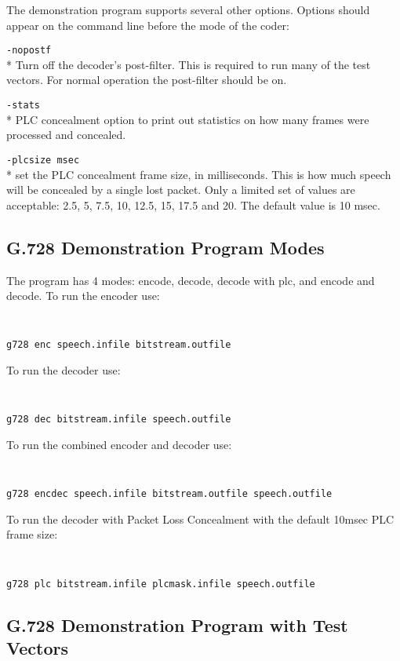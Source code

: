 The demonstration program supports several other options. Options should
appear on the command line before the mode of the coder:

{\tt -nopostf}\\*
Turn off the decoder's post-filter. This is required to run many of
the test vectors. For normal operation the post-filter should be on.

{\tt -stats}\\*
PLC concealment option to print out statistics on how
many frames were processed and concealed.

{\tt -plcsize msec}\\*
set the PLC concealment frame size, in milliseconds. This is how much speech
will be concealed by a single lost packet. Only a limited set of values
are acceptable: 2.5, 5, 7.5, 10, 12.5, 15, 17.5 and 20. The default value
is 10 msec.

\subsection {G.728 Demonstration Program Modes}

The program has 4 modes: encode, decode, decode with plc, and encode and decode.
To run the encoder use:

{\tt\small
\begin{verbatim}
g728 enc speech.infile bitstream.outfile
\end{verbatim}
}

To run the decoder use:

{\tt\small
\begin{verbatim}
g728 dec bitstream.infile speech.outfile
\end{verbatim}
}

To run the combined encoder and decoder use:

{\tt\small
\begin{verbatim}
g728 encdec speech.infile bitstream.outfile speech.outfile
\end{verbatim}
}

To run the decoder with Packet Loss Concealment with the default 10msec
PLC frame size:

{\tt\small
\begin{verbatim}
g728 plc bitstream.infile plcmask.infile speech.outfile
\end{verbatim}
}

\subsection {G.728 Demonstration Program with Test Vectors}

